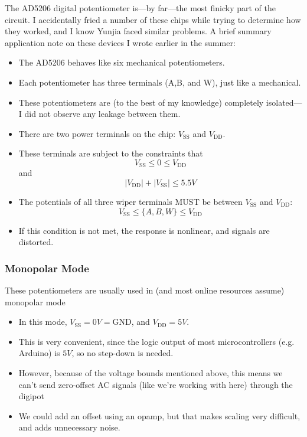 \documentclass{article}
\begin{document}
    The AD5206 digital potentiometer is---by far---the most finicky part of the circuit. I accidentally fried a number of these chips while trying to determine how they worked, and I know Yunjia faced similar problems. A brief summary application note on these devices I wrote earlier in the summer:

    \begin{itemize}
        \item The AD5206 behaves like six mechanical potentiometers.
        \item Each potentiometer has three terminals (A,B, and W), just like a mechanical.
        \item These potentiometers are (to the best of my knowledge) completely isolated---I did not observe any leakage between them.
        \item There are two power terminals on the chip: $V_{\text{SS}}$ and $V_{\text{DD}}$.
        \item These terminals are subject to the constraints that
        \begin{equation*}
            V_{\text{SS}} \leq 0 \leq V_{\text{DD}}
        \end{equation*}
        and
        \begin{equation*}
            |V_{\text{DD}}| + |V_{\text{SS}}| \leq 5.5V
        \end{equation*}
        \item The potentials of all three wiper terminals MUST be between $V_\text{SS}$ and $V_\text{DD}$:
        \begin{equation*}
            V_\text{SS} \leq \{A,B,W\} \leq V_\text{DD}
        \end{equation*}
        \item If this condition is not met, the response is nonlinear, and signals are distorted.
    \end{itemize}
    \subsubsection*{Monopolar Mode}
        These potentiometers are usually used in (and most online resources assume) monopolar mode
        \begin{itemize}
            \item In this mode, $V_{\text{SS}} = 0V = \text{GND}$, and $V_{\text{DD}} = 5V$.
            \item This is very convenient, since the logic output of most microcontrollers (e.g. Arduino) is $5V$, so no step-down is needed.
            \item However, because of the voltage bounds mentioned above, this means we can't send zero-offset AC signals (like we're working with here) through the digipot
            \item We could add an offset using an opamp, but that makes scaling very difficult, and adds unnecessary noise.
        \end{itemize}
\end{document}
